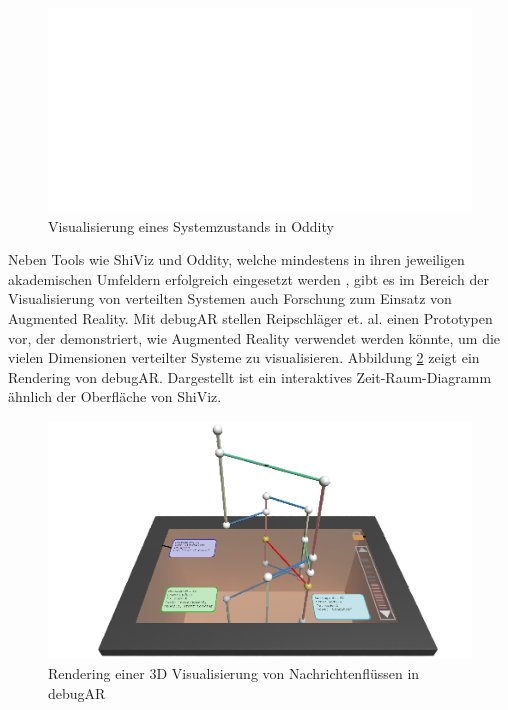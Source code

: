 \documentclass[12pt,a4paper]{report}
\begin{document}
\begin{figure}[H]
	\centering
	\includegraphics[width=\linewidth]{img/oddity_raft_state.pdf}
    \caption[Visualisierung eines Systemzustands in Oddity]{Visualisierung eines Systemzustands in Oddity \cite{oddity_graphical_debugger}}
	\label{fig:oddity}
\end{figure}

Neben Tools wie ShiViz und Oddity, welche mindestens in ihren jeweiligen akademischen Umfeldern erfolgreich eingesetzt werden
\cite{ShiViz_usage_study, oddity_usage_in_education}, gibt es im Bereich der Visualisierung von verteilten Systemen auch Forschung
zum Einsatz von Augmented Reality. Mit debugAR stellen Reipschläger et. al. \cite{debugAR_AR_debugger} einen Prototypen vor, der
demonstriert, wie Augmented Reality verwendet werden könnte, um die vielen Dimensionen verteilter Systeme zu visualisieren.
Abbildung \ref{fig:debugAR} zeigt ein Rendering von debugAR. Dargestellt ist ein interaktives Zeit-Raum-Diagramm ähnlich der
Oberfläche von ShiViz.

\begin{figure}[H]
	\centering
	\includegraphics[width=\linewidth]{img/debugAR_rendering.png}
    \caption[Rendering einer 3D Visualisierung von Nachrichtenflüssen in debugAR]{Rendering einer 3D Visualisierung von Nachrichtenflüssen in debugAR \cite{debugAR_AR_debugger}}
	\label{fig:debugAR}
\end{figure}
\end{document}
